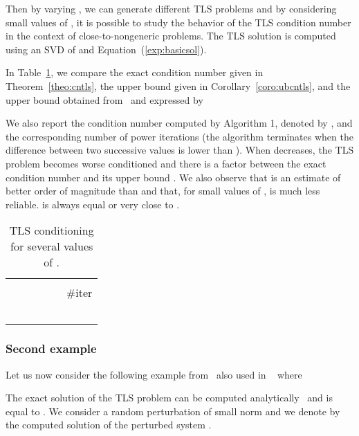 \documentclass[a4paper]{article}
\begin{document}
{{Then by varying , we can generate different TLS problems and by considering small values of , it is possible to study the behavior of the TLS condition number in the context of close-to-nongeneric problems.
The TLS solution  is computed using an SVD of  and Equation~(\ref{exp:basicsol}).

In Table~\ref{tab:num2}, we compare the exact condition number  given in Theorem~\ref{theo:cntls},
the upper bound  given in Corollary~\ref{coro:ubcntls},
and the upper bound obtained from~\cite[p. 212]{vava91}
and expressed by

We also report the condition number computed by Algorithm 1, denoted by ,
and the corresponding number of power iterations
(the algorithm terminates when the difference between two successive values is lower than ).
When  decreases, the TLS problem becomes worse conditioned and there is a factor 
between the exact condition number  and its upper bound .
We also observe that  is an estimate of better order of magnitude than
 and that, for small values of ,  is much less reliable.
 is always equal or very close to .
\begin{table}[hbtp!]
\centering
\caption{TLS conditioning for several values of .}
\vspace{0.4cm}
\begin{tabular}{|c|c|c|c|c|c|}
\hline
&&&&&\\
&&&&&\#iter\\
&&&&&\\
\hline
&&&&&\\
\hline
&&&&&\\
\hline
&&&&&\\
\hline
&&&&&\\
\hline
\end{tabular}
\label{tab:num2}
\end{table}
\subsubsection{Second example}
Let us now consider the following example from~\cite[p. 42]{vava91} also used in ~\cite{WEI.09} where

The exact solution of the TLS problem  can be computed analytically~\cite[p. 42]{vava91} and is equal to .
We consider a random perturbation  of small norm  and we denote by  the computed solution of the perturbed system .

}}
\end{document}
